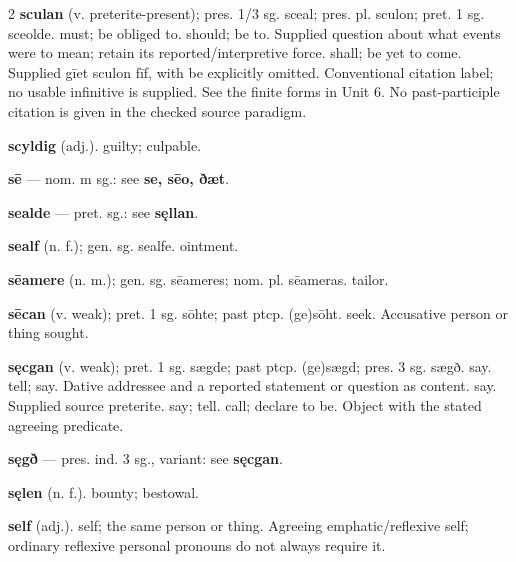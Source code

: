 \begin{multicols*}{2}
\textbf{sculan} (v. preterite-present); pres. 1/3 sg. sceal; pres. pl. sculon; pret. 1 sg. sceolde. must; be obliged to. should; be to. Supplied question about what events were to mean; retain its reported/interpretive force. shall; be yet to come. Supplied gīet sculon fīf, with be explicitly omitted. Conventional citation label; no usable infinitive is supplied. See the finite forms in Unit 6. No past-participle citation is given in the checked source paradigm.\par
\textbf{scyldig} (adj.). guilty; culpable.\par
\textbf{sē} — nom. m sg.: see \textbf{se, sēo, ðæt}.\par
\textbf{sealde} — pret. sg.: see \textbf{sęllan}.\par
\textbf{sealf} (n. f.); gen. sg. sealfe. ointment.\par
\textbf{sēamere} (n. m.); gen. sg. sēameres; nom. pl. sēameras. tailor.\par
\textbf{sēcan} (v. weak); pret. 1 sg. sōhte; past ptcp. (ge)sōht. seek. Accusative person or thing sought.\par
\textbf{sęcgan} (v. weak); pret. 1 sg. sægde; past ptcp. (ge)sægd; pres. 3 sg. sægð. say. tell; say. Dative addressee and a reported statement or question as content. say. Supplied source preterite. say; tell. call; declare to be. Object with the stated agreeing predicate.\par
\textbf{sęgð} — pres. ind. 3 sg., variant: see \textbf{sęcgan}.\par
\textbf{sęlen} (n. f.). bounty; bestowal.\par
\textbf{self} (adj.). self; the same person or thing. Agreeing emphatic/reflexive self; ordinary reflexive personal pronouns do not always require it.\par

\end{multicols*}
